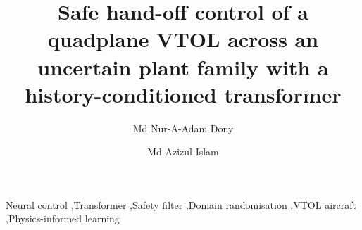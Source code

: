 \documentclass[final,5p,times,twocolumn]{elsarticle}
\begin{document}
\begin{frontmatter}
\title{Safe hand-off control of a quadplane VTOL across an uncertain plant family with a history-conditioned transformer}
\author[tt]{Md Nur-A-Adam Dony}
\author[kl]{Md Azizul Islam}
\begin{abstract}

\end{abstract}
\begin{keyword}
Neural control \sep Transformer \sep Safety filter \sep Domain randomisation \sep VTOL aircraft \sep Physics-informed learning
\end{keyword}
\end{frontmatter}












\end{document}
